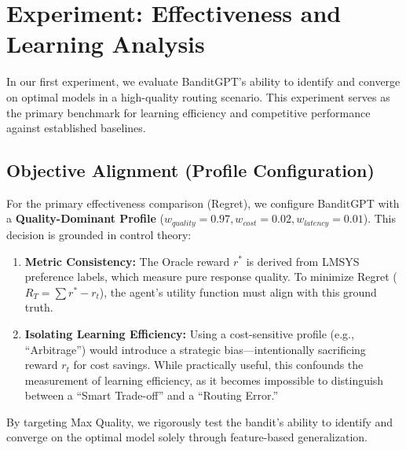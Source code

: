 \section{Experiment: Effectiveness and Learning Analysis}
In our first experiment, we evaluate BanditGPT's ability to identify and converge on optimal models in a high-quality routing scenario. This experiment serves as the primary benchmark for learning efficiency and competitive performance against established baselines.

\subsection{Objective Alignment (Profile Configuration)}
For the primary effectiveness comparison (Regret), we configure BanditGPT with a \textbf{Quality-Dominant Profile} ($w_{quality}=0.97, w_{cost}=0.02, w_{latency}=0.01$). This decision is grounded in control theory:
\begin{enumerate}
    \item \textbf{Metric Consistency:} The Oracle reward $r^*$ is derived from LMSYS preference labels, which measure pure response quality. To minimize Regret ($R_T = \sum r^* - r_t$), the agent's utility function must align with this ground truth.
    \item \textbf{Isolating Learning Efficiency:} Using a cost-sensitive profile (e.g., ``Arbitrage'') would introduce a strategic bias---intentionally sacrificing reward $r_t$ for cost savings. While practically useful, this confounds the measurement of learning efficiency, as it becomes impossible to distinguish between a ``Smart Trade-off'' and a ``Routing Error.''
\end{enumerate}
By targeting Max Quality, we rigorously test the bandit's ability to identify and converge on the optimal model solely through feature-based generalization.

